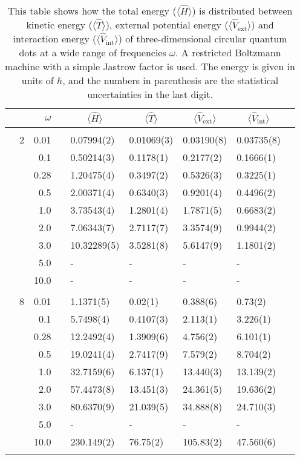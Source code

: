 \begin{table}[H]
	\caption{This table shows how the total energy ($\langle\hat{H}\rangle$) is distributed between kinetic energy ($\langle\hat{T}\rangle$), external potential energy ($\langle\hat{V}_{\text{ext}}\rangle$) and interaction energy ($\langle\hat{V}_{\text{int}}\rangle$) of three-dimensional circular quantum dots at a wide range of frequencies $\omega$. A restricted Boltzmann machine with a simple Jastrow factor is used. The energy is given in units of $\hbar$, and the numbers in parenthesis are the statistical uncertainties in the last digit.}
	\label{tab:splitfrequencyQDRBMSJ3D}
	\begin{tabularx}{\textwidth}{R{1cm}rrcR{2.3cm}R{2.3cm}R{2.3cm}R{2.3cm}R{1cm}} \hline\hline
		&\makecell{\\ \phantom{$N$} \\ \phantom{=}} & $\omega$ &&  &  &  &  \\ \hline \\
		&2 & 0.01 && 0.07994(2) & 0.01069(3) & 0.03190(8) & 0.03735(8) \\
		&& 0.1 && 0.50214(3) & 0.1178(1) & 0.2177(2) & 0.1666(1) \\
		&& 0.28 && 1.20475(4) & 0.3497(2) & 0.5326(3) & 0.3225(1) \\
		&& 0.5 && 2.00371(4) & 0.6340(3) & 0.9201(4) & 0.4496(2) \\
		&& 1.0 && 3.73543(4) & 1.2801(4) & 1.7871(5) & 0.6683(2) \\
		&& 2.0 && 7.06343(7) & 2.7117(7) & 3.3574(9) & 0.9944(2) \\
		&& 3.0 && 10.32289(5) & 3.5281(8) & 5.6147(9) & 1.1801(2) \\ 
		&& 5.0 && - & - & - & -\\
		&& 10.0 && - & - & - & -\\
		\hdashline \\
		
		&8 & 0.01 && 1.1371(5) & 0.02(1) & 0.388(6) & 0.73(2) \\
		&& 0.1 && 5.7498(4) & 0.4107(3) & 2.113(1) & 3.226(1) \\
		&& 0.28 && 12.2492(4) & 1.3909(6) & 4.756(2) & 6.101(1) \\
		&& 0.5 && 19.0241(4) & 2.7417(9) & 7.579(2) & 8.704(2) \\
		&& 1.0 && 32.7159(6) & 6.137(1) & 13.440(3) & 13.139(2) \\
		&& 2.0 && 57.4473(8) & 13.451(3) & 24.361(5) & 19.636(2) \\
		&& 3.0 && 80.6370(9) & 21.039(5) & 34.888(8) & 24.710(3) \\ 
		&& 5.0 && - & - & - & -\\
		&& 10.0 && 230.149(2) & 76.75(2) & 105.83(2) & 47.560(6) \\
		\hdashline \\
		

\end{tabularx}
\end{table}
